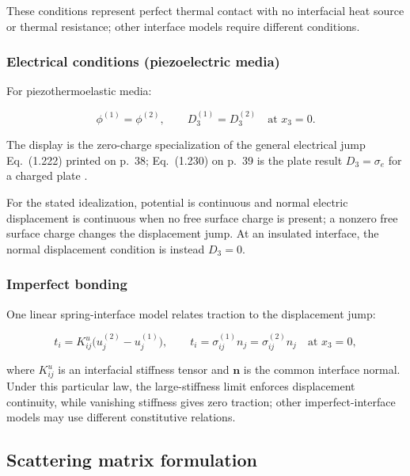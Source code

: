 These conditions represent perfect thermal contact with no interfacial heat source or thermal resistance; other interface models require different conditions.

\subsubsection{Electrical conditions (piezoelectric media)}

For piezothermoelastic media:

\begin{equation}
\phi^{(1)} = \phi^{(2)}, \qquad D_3^{(1)} = D_3^{(2)} \quad \text{at } x_3 = 0.
\label{eq:9.5}
\end{equation}

The display is the zero-charge specialization of the general electrical jump Eq.~(1.222) printed on p.~38; Eq.~(1.230) on p.~39 is the plate result $D_3=\sigma_e$ for a charged plate \cite{Yang2018}.

For the stated idealization, potential is continuous and normal electric displacement is continuous when no free surface charge is present; a nonzero free surface charge changes the displacement jump. At an insulated interface, the normal displacement condition is instead $D_3=0$.

\subsubsection{Imperfect bonding}

One linear spring-interface model relates traction to the displacement jump:

\begin{equation}
t_i = K_{ij}^u\bigl(u_j^{(2)} - u_j^{(1)}\bigr), \qquad t_i = \sigma_{ij}^{(1)}n_j = \sigma_{ij}^{(2)}n_j \quad \text{at } x_3=0,
\label{eq:9.6}
\end{equation}

where $K_{ij}^u$ is an interfacial stiffness tensor and $\bm{n}$ is the common interface normal. Under this particular law, the large-stiffness limit enforces displacement continuity, while vanishing stiffness gives zero traction; other imperfect-interface models may use different constitutive relations.

\subsection{Scattering matrix formulation}
\label{sec:9.4}

